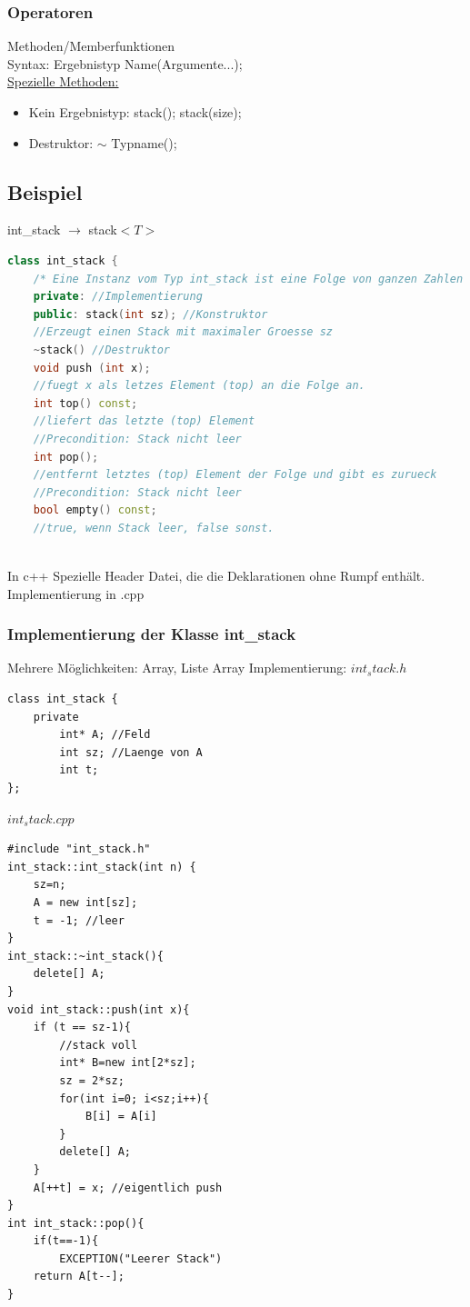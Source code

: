 \documentclass[a4paper]{article}
\begin{document}
\subsubsection*{Operatoren}
Methoden/Memberfunktionen\\
Syntax: Ergebnistyp Name(Argumente...);\\
\underline{Spezielle Methoden:} 
\begin{itemize}
	\item Kein Ergebnistyp: stack(); stack(size);
	\item Destruktor: $\sim$ Typname();
\end{itemize}
\subsection*{Beispiel}
int\_stack $\rightarrow$ stack$<T>$\\
\begin{lstlisting}[language=c++]
class int_stack {
	/* Eine Instanz vom Typ int_stack ist eine Folge von ganzen Zahlen (int). Eine Folge der laenge 0 heisst der leere Stack.*/
	private: //Implementierung
	public: stack(int sz); //Konstruktor
	//Erzeugt einen Stack mit maximaler Groesse sz
	~stack() //Destruktor
	void push (int x);
	//fuegt x als letzes Element (top) an die Folge an.
	int top() const;
	//liefert das letzte (top) Element
	//Precondition: Stack nicht leer
	int pop();
	//entfernt letztes (top) Element der Folge und gibt es zurueck
	//Precondition: Stack nicht leer
	bool empty() const;
	//true, wenn Stack leer, false sonst.
	
\end{lstlisting}
In c++ Spezielle Header Datei, die die Deklarationen ohne Rumpf enthält. Implementierung in .cpp\\
\subsubsection*{Implementierung der Klasse int\_stack}
Mehrere Möglichkeiten: Array, Liste
Array Implementierung:
$int_stack.h$
\begin{lstlisting}
class int_stack {
	private 
		int* A; //Feld
		int sz; //Laenge von A
		int t;
};
\end{lstlisting}
$int_stack.cpp$
\begin{lstlisting}[escapechar=!]
#include "int_stack.h"
int_stack::int_stack(int n) {
	sz=n;
	A = new int[sz];
	t = -1; //leer
}
int_stack::~int_stack(){
	delete[] A;
}
void int_stack::push(int x){
	if (t == sz-1){
		//stack voll
		int* B=new int[2*sz];
		sz = 2*sz;
		for(int i=0; i<sz;i++){
			B[i] = A[i]
		}
		delete[] A;
	}
	A[++t] = x; //eigentlich push
}
int int_stack::pop(){
	if(t==-1){
		EXCEPTION("Leerer Stack")
	return A[t--];
}

\end{lstlisting}
\end{document}
